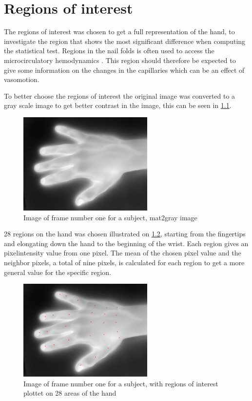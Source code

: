 \chapter{Regions of interest}

The regions of interest was chosen to get a full representation of the hand, to investigate the region that shows the most significant difference when computing the statistical test. 
Regions in the nail folds is often used to access the microcirculatory hemodynamics \cite{martina1998}. This region should therefore be expected to give some information on the changes in the capillaries which can be an effect of vasomotion. 

To better choose the regions of interest the original image was converted to a gray scale image to get better contrast in the image, this can be seen in \ref{fig:mat2grayHand}. 

\begin{figure}[H]
	\includegraphics[width=0.6\textwidth]{figures/mat2grayHand}  %
	\caption{Image of frame number one for a subject, mat2gray image}
	\label{fig:mat2grayHand}  %
\end{figure}

28 regions on the hand was chosen illustrated on \ref{fig:roiHand}, starting from the fingertips and elongating down the hand to the beginning of the wrist. Each region gives an pixelintensity value from one pixel. The mean of the chosen pixel value and the neighbor pixels, a total  of nine pixels, is calculated for each region to get a more general value for the specific region.

\begin{figure}[H]
	\includegraphics[width=0.6\textwidth]{figures/roiHand}  %
	\caption{Image of frame number one for a subject, with regions of interest plottet on 28 areas of the hand}
	\label{fig:roiHand}  %
\end{figure}

